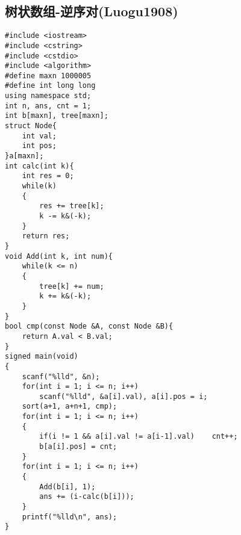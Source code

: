 \documentclass[UTF8]{ctexart}
\begin{document}
	\subsection{树状数组-逆序对(Luogu1908)}
	{\setmainfont{Consolas}
\begin{lstlisting}
#include <iostream>
#include <cstring>
#include <cstdio>
#include <algorithm>
#define maxn 1000005
#define int long long
using namespace std;
int n, ans, cnt = 1;
int b[maxn], tree[maxn];
struct Node{
    int val;
    int pos;
}a[maxn];
int calc(int k){
    int res = 0;
    while(k)
    {
        res += tree[k];
        k -= k&(-k);
    }
    return res;
}
void Add(int k, int num){
    while(k <= n)
    {
        tree[k] += num;
        k += k&(-k);
    }
}
bool cmp(const Node &A, const Node &B){
    return A.val < B.val;
}
signed main(void)
{
    scanf("%lld", &n);
    for(int i = 1; i <= n; i++)	
        scanf("%lld", &a[i].val), a[i].pos = i;
    sort(a+1, a+n+1, cmp);
    for(int i = 1; i <= n; i++)
    {
        if(i != 1 && a[i].val != a[i-1].val)	cnt++;
        b[a[i].pos] = cnt;
    }
    for(int i = 1; i <= n; i++)
    {
        Add(b[i], 1);
        ans += (i-calc(b[i]));
    }
    printf("%lld\n", ans);
}
\end{lstlisting}}
\newpage
\end{document}
